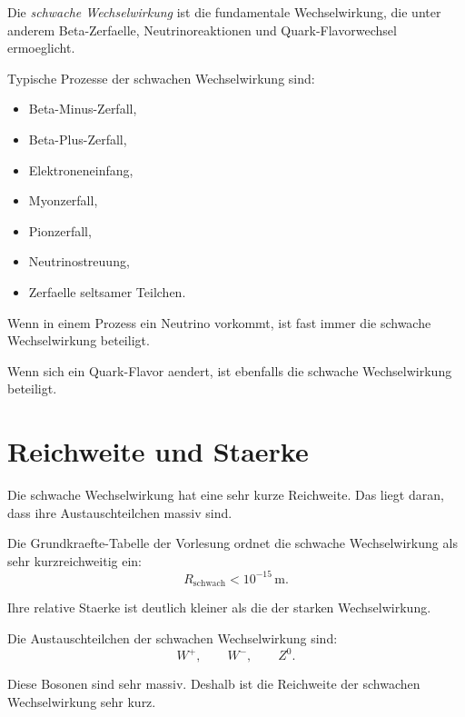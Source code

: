 \begin{definitionbox}
Die \emph{schwache Wechselwirkung} ist die fundamentale Wechselwirkung, die unter
anderem Beta-Zerfaelle, Neutrinoreaktionen und Quark-Flavorwechsel ermoeglicht.
\end{definitionbox}

\begin{conceptbox}
Typische Prozesse der schwachen Wechselwirkung sind:
\begin{itemize}
    \item Beta-Minus-Zerfall,
    \item Beta-Plus-Zerfall,
    \item Elektroneneinfang,
    \item Myonzerfall,
    \item Pionzerfall,
    \item Neutrinostreuung,
    \item Zerfaelle seltsamer Teilchen.
\end{itemize}
\end{conceptbox}

\begin{examtipbox}
Wenn in einem Prozess ein Neutrino vorkommt, ist fast immer die schwache
Wechselwirkung beteiligt.

Wenn sich ein Quark-Flavor aendert, ist ebenfalls die schwache Wechselwirkung
beteiligt.
\end{examtipbox}

\section{Reichweite und Staerke}

Die schwache Wechselwirkung hat eine sehr kurze Reichweite.
Das liegt daran, dass ihre Austauschteilchen massiv sind.

\begin{notebox}
Die Grundkraefte-Tabelle der Vorlesung ordnet die schwache Wechselwirkung als sehr
kurzreichweitig ein:
\[
    R_{\mathrm{schwach}} < 10^{-15}\,\mathrm{m}.
\]

Ihre relative Staerke ist deutlich kleiner als die der starken Wechselwirkung.
\end{notebox}

\begin{conceptbox}
Die Austauschteilchen der schwachen Wechselwirkung sind:
\[
    W^+,
    \qquad
    W^-,
    \qquad
    Z^0.
\]

Diese Bosonen sind sehr massiv.
Deshalb ist die Reichweite der schwachen Wechselwirkung sehr kurz.
\end{conceptbox}

